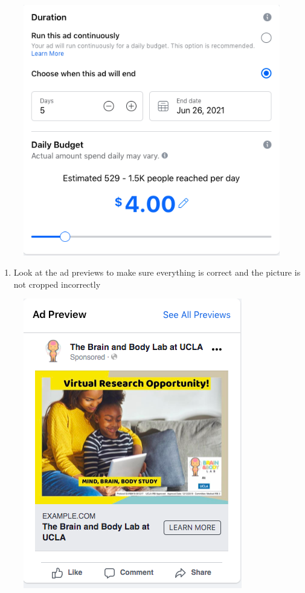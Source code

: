 \documentclass[]{book}
\providecommand{\tightlist}{%
  \setlength{\itemsep}{0pt}\setlength{\parskip}{0pt}}
\begin{document}
\begin{figure}
\centering
\includegraphics{images/lab_protocols/fb_ads/9.png}
\caption{}
\end{figure}

\begin{enumerate}
\def\labelenumi{\arabic{enumi}.}
\setcounter{enumi}{9}
\tightlist
\item
  Look at the ad previews to make sure everything is correct and the picture is not cropped incorrectly
\end{enumerate}

\begin{figure}
\centering
\includegraphics{images/lab_protocols/fb_ads/10.png}
\caption{}
\end{figure}
\end{document}
